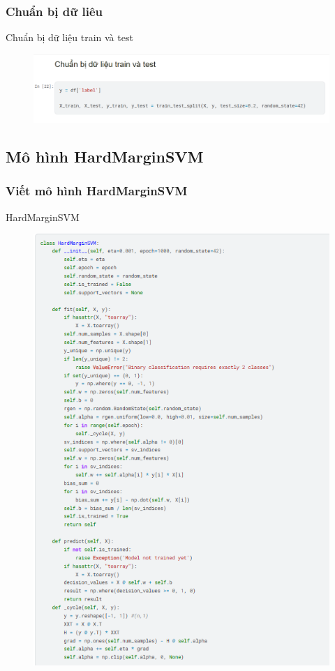 \documentclass[serif, aspectratio=169]{beamer}
\begin{document}
	\subsubsection{Chuẩn bị dữ liêu}
	\begin{frame}{Chuẩn bị dữ liệu train và test}
		\begin{figure}
			\centering
			\includegraphics[width=1\linewidth]{pic/train_test_split.png}
			\label{fig:train-test-split}
		\end{figure}
	\end{frame}
	
	\subsection{Mô hình HardMarginSVM}
	\subsubsection{Viết mô hình HardMarginSVM}
	\begin{frame}{HardMarginSVM}
		\begin{figure}
			\centering
			\includegraphics[width=0.5\linewidth]{pic/hard-margin-svm.png}
			\label{fig:hard-margin-svm}
		\end{figure}
	\end{frame}
\end{document}
